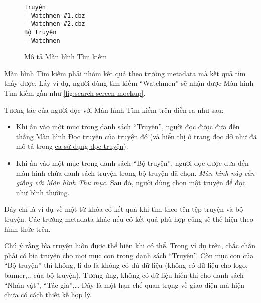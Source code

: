 \documentclass[../../thesis]{subfiles}
\begin{document}
\begin{wrapfigure}[8]{r}{4.5cm}
\vspace*{-10mm}
\begin{verbatim}
Truyện
- Watchmen #1.cbz
- Watchmen #2.cbz
Bộ truyện
- Watchmen
\end{verbatim}
\caption{Mô tả Màn hình Tìm kiếm}
\label{fig:search-screen-mockup}
\end{wrapfigure}

Màn hình Tìm kiếm phải nhóm kết quả theo trường metadata mà kết quả tìm thấy
được. Lấy ví dụ, người dùng tìm kiếm ``Watchmen'' sẽ nhận được Màn hình Tìm kiếm
gần như \autoref{fig:search-screen-mockup}.

Tương tác của người đọc với Màn hình Tìm kiếm trên diễn ra như sau:

\begin{itemize}
    \item
        Khi ấn vào một mục trong danh sách ``Truyện'', người đọc được đưa đến
        thẳng Màn hình Đọc truyện của truyện đó (và hiển thị ở trang đọc dở như
        đã mô tả trong \hyperref[sec:read-comic]{ca sử dụng đọc truyện}).
\end{itemize}

\begin{itemize}[resume, before = \vspace*{-\dimexpr\topsep+\partopsep\relax}]
    \item
        Khi ấn vào một mục trong danh sách ``Bộ truyện'', người đọc được đưa đến
        màn hình chứa danh sách truyện trong bộ truyện đã chọn. \emph{Màn hình
        này cần giống với Màn hình Thư mục}. Sau đó, người dùng chọn một truyện
        để đọc như bình thường.
\end{itemize}

Đây chỉ là ví dụ về một từ khóa có kết quả khi tìm theo tên tệp truyện và bộ
truyện. Các trường metadata khác nếu có kết quả phù hợp cũng sẽ thể hiện theo
hình thức trên.

Chú ý rằng bìa truyện luôn được thể hiện khi có thể. Trong ví dụ trên, chắc chắn
phải có bìa truyện cho mọi mục con trong danh sách ``Truyện''. Còn mục con của
``Bộ truyện'' thì không, lí do là không có đủ dữ liệu (không có dữ liệu cho
logo, banner,.. của bộ truyện). Tương ứng, không có dữ liệu hiển thị cho danh
sách ``Nhân vật'', ``Tác giả'',\ldots{} Đây là một hạn chế quan trọng về giao
diện mà hiện chưa có cách thiết kế hợp lý.
\end{document}

